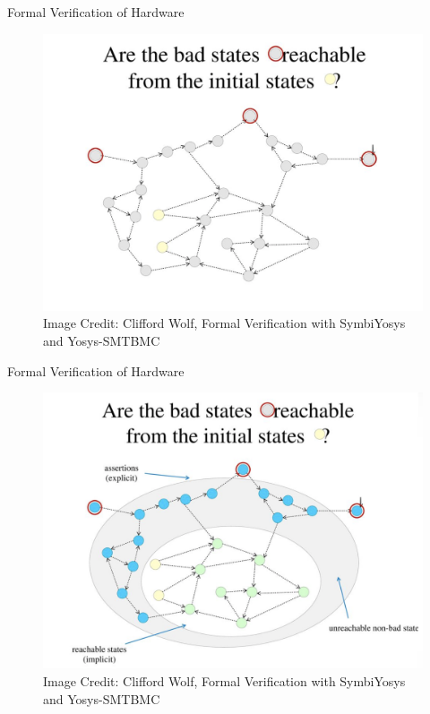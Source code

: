 \documentclass{beamer}
\begin{document}
\begin{frame}{Formal Verification of Hardware}
  \begin{figure}[h]
    \includegraphics[width=\textwidth]{formal_1}
    \scriptsize Image Credit: Clifford Wolf, Formal Verification with SymbiYosys and Yosys-SMTBMC
  \end{figure}
\end{frame}

\begin{frame}{Formal Verification of Hardware}
  \begin{figure}[h]
    \includegraphics[width=\textwidth]{formal_2}
    \scriptsize Image Credit: Clifford Wolf, Formal Verification with SymbiYosys and Yosys-SMTBMC
  \end{figure}
\end{frame}
\end{document}
